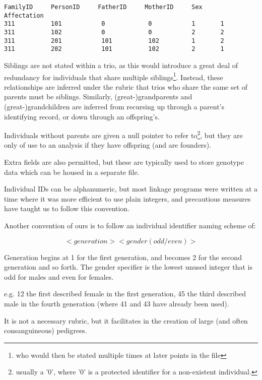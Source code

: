 \begingroup
\begin{lstlisting}[label=verb:pedfile]
FamilyID     PersonID     FatherID     MotherID     Sex     Affectation
311          101           0            0           1       1
311          102           0            0           2       2
311          201           101          102         1       2
311          202           101          102         2       1
\end{lstlisting}
\endgroup

Siblings are not stated within a trio, as this would introduce a great deal of redundancy for individuals that share multiple siblings\footnote{who would then be stated multiple times at later points in the file}. Instead, these relationships are inferred under the rubric that trios who share the same set of parents must be siblings. Similarly, (great-)grandparents and (great-)grandchildren are inferred from recursing up through a parent's identifying record, or down through an offspring's.

Individuals without parents are given a null pointer to refer to\footnote{usually a '0', where '0' is a protected identifier for a non-existent individual.}, but they are only of use to an analysis if they have offspring (and are founders).


Extra fields are also permitted, but these are typically used to store genotype data which can be housed in a separate file.

Individual IDs can be alphanumeric, but most linkage programs were written at a time where it was more efficient to use plain integers, and precautious measures have taught us to follow this convention. 

Another convention of ours is to follow an individual identifier naming scheme of:

$$ <generation><gender (odd/even)> $$

Generation begins at 1 for the first generation, and becomes 2 for the second generation and so forth. The gender specifier is the lowest unused integer that is odd for males and even for females.

e.g.  12 the first described female in the first generation, 45 the third described male in the fourth generation (where 41 and 43 have already been used).

It is not a necessary rubric, but it facilitates in the creation of large (and often consanguineous) pedigrees.

